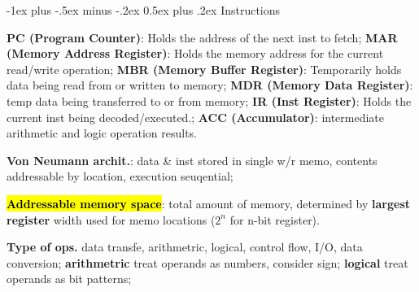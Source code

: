 \documentclass[a4paper]{article}
\makeatletter
\renewcommand{\section}{\@startsection{section}{1}{0mm}%
                                {-1ex plus -.5ex minus -.2ex}%
                                {0.5ex plus .2ex}%
                                {\normalfont\normalsize\bfseries}}
\makeatother
\begin{document}
\begin{multicols*}{2}
  \section{Instructions}

  \textbf{PC (Program Counter)}: Holds the address of the next inst to fetch;
  \textbf{MAR (Memory Address Register)}: Holds the memory address for the current read/write operation;
  \textbf{MBR (Memory Buffer Register)}: Temporarily holds data being read from or written to memory;
  \textbf{MDR (Memory Data Register)}: temp data being transferred to or from memory;
  \textbf{IR (Inst Register)}: Holds the current inst being decoded/executed.;
  \textbf{ACC (Accumulator)}: intermediate arithmetic and logic operation results.

  \textbf{Von Neumann archit.}: data \& inst stored in single w/r memo, contents addressable by location, execution seuqential;

  \hl{\textbf{Addressable memory space}}: total amount of memory, determined by \textbf{largest register} width used for memo locations ($2^n$ for n-bit register).

  \textbf{Type of ops.} data transfe, arithmetric, logical, control flow, I/O, data conversion; \textbf{arithmetric} treat operands as numbers, consider sign; \textbf{logical} treat operands as bit patterns;


\end{multicols*}
\end{document}
